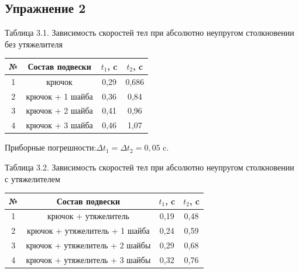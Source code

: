 \documentclass[12pt]{article}
\begin{document}
\subsection*{Упражнение 2}
\begin{center}

Таблица 3.1. Зависимость скоростей тел при абсолютно неупругом столкновении без утяжелителя
\begin{table}[h!]
\begin{center}
\begin{tabular}{|c|c|c|c|}
\hline
 № & Состав подвески & $t_{1}$, c & $t_{2}$, c \\
\hline
 1 &    крючок &	0,29	 &0,686 \\
\hline

 2 & крючок + 1 шайба &	0,36	 &0,84 \\
\hline
 3 &  крючок + 2 шайба &	0,41 &	0,96 \\
\hline
 4 &крючок + 3 шайба &	0,46	 &1,07 \\
\hline

\end{tabular}

Приборные погрешности:$\Delta t_{1}=\Delta t_{2} = 0,05$ c. 
\end{center}
\end{table}

Таблица 3.2. Зависимость скоростей тел при абсолютно неупругом столкновении с утяжелителем
\begin{table}[h!]
\begin{center}
\begin{tabular}{|c|c|c|c|}
\hline
 № & Состав подвески & $t_{1}$, c & $t_{2}$, c \\
\hline
 1 &    крючок + утяжелитель&	0,19&	0,48\\
\hline

 2 & крючок + утяжелитель + 1 шайба&	0,24&	0,59 \\
\hline
 3 & крючок + утяжелитель + 2 шайбы&	0,29&	0,68 \\
\hline
 4 &крючок + утяжелитель + 3 шайбы	&0,32&	0,76 \\
\hline
\end{tabular}
\end{center}
\end{table}             
\end{center}
\newpage
\end{document}
